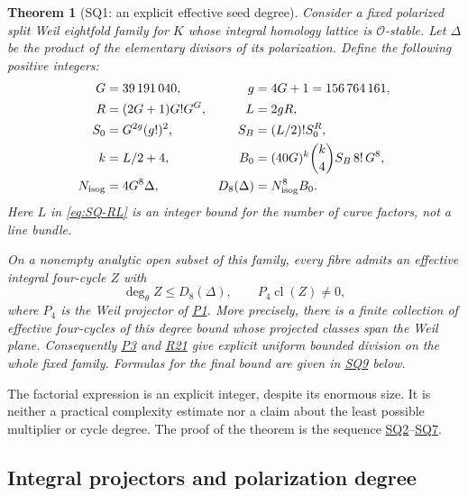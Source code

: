 \documentclass[11pt,a4paper]{article}
\newtheorem{theorem}{Theorem}[section]
\theoremstyle{definition}\newtheorem{definition}[theorem]{Definition}
\theoremstyle{remark}\newtheorem{remark}[theorem]{Remark}
\newcommand{\cO}{\mathcal O}\newcommand{\CH}{\operatorname{CH}}\newcommand{\cl}{\operatorname{cl}}
\newcommand{\findingref}[1]{\hyperref[#1]{\textsf{#1}}}
\begin{document}
\begin{theorem}[SQ1: an explicit effective seed degree]\label{SQ1}
Consider a fixed polarized split Weil eightfold family for $K$ whose integral homology lattice is $\cO$-stable. Let $\Delta$ be the product of the elementary divisors of its polarization. Define the following positive integers:
\begin{align}
 G&=39\,191\,040, & g&=4G+1=156\,764\,161,\label{eq:SQ-Gg}\\
 R&=(2G+1)G!G^G, & L&=2gR,\label{eq:SQ-RL}\\
 S_0&=G^{2g}(g!)^2, & S_B&=(L/2)!S_0^R,\label{eq:SQ-S}\\
 k&=L/2+4, & B_0&=(40G)^k\binom{k}{4}S_B\,8!\,G^8,\label{eq:SQ-B}\\
 N_{\rm isog}&=4G^8\Delta, & D_8(\Delta)&=N_{\rm isog}^{8}B_0.\label{eq:SQ-D}
\end{align}
Here $L$ in \eqref{eq:SQ-RL} is an integer bound for the number of curve factors, not a line bundle.

On a nonempty analytic open subset of this family, every fibre admits an effective integral four-cycle $Z$ with
\[
 \deg_\theta Z\le D_8(\Delta),\qquad P_4\cl(Z)\ne0,
\]
where $P_4$ is the Weil projector of \findingref{P1}. More precisely, there is a finite collection of effective four-cycles of this degree bound whose projected classes span the Weil plane. Consequently \findingref{P3} and \findingref{R21} give explicit uniform bounded division on the whole fixed family. Formulas for the final bound are given in \findingref{SQ9} below.
\end{theorem}

The factorial expression is an explicit integer, despite its enormous size. It is neither a practical complexity estimate nor a claim about the least possible multiplier or cycle degree. The proof of the theorem is the sequence \findingref{SQ2}--\findingref{SQ7}.

\subsection{Integral projectors and polarization degree}
\end{document}
